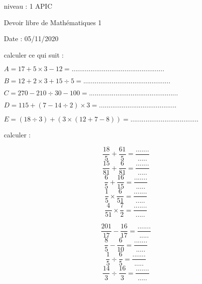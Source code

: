 \documentclass[addpoints]{exam}
\begin{document}
\begin{tcolorbox}
\begin{minipage}{0.2\linewidth}
niveau : 1 APIC
\end{minipage}\hfill
\begin{minipage}{0.5\linewidth}
Devoir libre de Mathématiques 1
\end{minipage}\hfill
\begin{minipage}{0.3\linewidth}
Date : 05/11/2020
\end{minipage}
\end{tcolorbox}
	
	
\begin{tcolorbox}[title=Exercice 1]
	\begin{questions}
		\question calculer ce qui suit :
		
		$ A=17+5\times 3-12=.................................................$\vspace{0.3cm}

$ B=12+2\times 3+15\div 5= ..............................................$\vspace{0.3cm}

$ C=270-210\div 30-100= ...............................................$\vspace{0.3cm}

$ D=115+(7-14\div 2)\times 3=.........................................$\vspace{0.3cm}

$ E=(18\div 3)+(3\times(12+7-8))=....................................$
		
	\end{questions}
\end{tcolorbox}

	
\begin{tcolorbox}[title=Exercice 2]
	\begin{questions}
		\question calculer :
		
\begin{minipage}{0.4\linewidth}
\[\dfrac{18}{5}+\dfrac{61}{5}=\dfrac{.......}{.....}\]
\[\dfrac{15}{81}+\dfrac{6}{81}=\dfrac{.......}{.....}\]
\[\dfrac{6}{5}+\dfrac{16}{15}=\dfrac{.......}{.....}\]
\[\dfrac{1}{5}\times \dfrac{6}{51}=\dfrac{.......}{.....}\]
\[\dfrac{4}{51}\times\dfrac{7}{2}=\dfrac{.......}{.....}\]

\end{minipage}
\begin{minipage}{0.4\linewidth}
\[\dfrac{201}{17}-\dfrac{16}{17}=\dfrac{.......}{.....}\]
\[\dfrac{8}{5}-\dfrac{6}{10}=\dfrac{.......}{.....}\]
\[\dfrac{1}{5}\div\dfrac{6}{5}=\dfrac{.......}{.....}\]
\[\dfrac{14}{3}\div\dfrac{16}{3}=\dfrac{.......}{.....}\]
\end{minipage}		
	\end{questions}
\end{tcolorbox}
\end{document}
